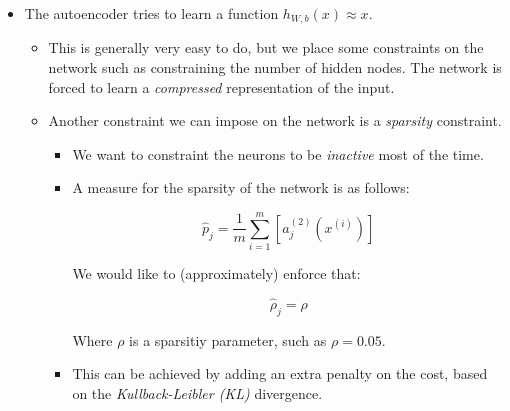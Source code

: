 \documentclass[]{article}
\begin{document}
\begin{itemize}
\item
  The autoencoder tries to learn a function \(h_{W,b}(x) \approx x\).

  \begin{itemize}
  \item
    This is generally very easy to do, but we place some constraints on
    the network such as constraining the number of hidden nodes. The
    network is forced to learn a \emph{compressed} representation of the
    input.
  \item
    Another constraint we can impose on the network is a \emph{sparsity}
    constraint.

    \begin{itemize}
    \item
      We want to constraint the neurons to be \emph{inactive} most of
      the time.
    \item
      A measure for the sparsity of the network is as follows:

      \[\hat p_j = \frac 1 m \sum_{i=1}^m\left[a_j^{(2)}(x^{(i)})\right]\]

      We would like to (approximately) enforce that:

      \[\hat \rho _j = \rho\]

      Where \(\rho\) is a sparsitiy parameter, such as \(\rho=0.05\). 
    \item
      This can be achieved by adding an extra penalty on the cost, based
      on the \emph{Kullback-Leibler (KL)} divergence.
    \end{itemize}
  \end{itemize}
\end{itemize}
\end{document}

